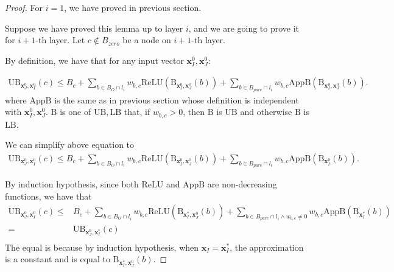 \documentclass[]{article}
\theoremstyle{definition}
\newcommand{\ReLU}{\mathrm{ReLU}}
\newcommand{\UB}{\mathrm{UB}}
\newcommand{\LB}{\mathrm{LB}}
\newcommand{\B}{\mathrm{B}}
\begin{document}
\begin{proof}
	
	For $i= 1$, we have proved in previous section.
	
	Suppose we have proved this lemma up to layer $i$, and we are going to prove it for $i+1$-th layer. Let $c\notin B_{zero}$ be a node on $i+1$-th layer.
	
	By definition, we have that for any input vector $\boldsymbol{x}^0_I,\boldsymbol{x}^0_J$:
	
	\begin{align*}
		\mathrm{UB}_{\boldsymbol{x}^0_J,\boldsymbol{x}^0_I}(c) \leq B_c + \sum_{b\in B_O\cap l_i} w_{b,c}\ReLU(\B_{\boldsymbol{x}^0_I,\boldsymbol{x}^0_J}(b)) + \sum_{b\in B_{pure}\cap l_{i}} w_{b,c} \mathrm{AppB}(\B_{\boldsymbol{x}^0_I,\boldsymbol{x}^0_J}(b)).
	\end{align*} where $\mathrm{AppB}$ is the same as in previous section  whose definition is independent with $\boldsymbol{x}^0_I,\boldsymbol{x}^0_J$. $\B$ is one of $\UB,\LB$  that, if $w_{b,c}>0$, then $\B$ is $\UB$ and otherwise $\B$ is $\LB$.
	
	We can simplify above equation to \begin{align*}
			\mathrm{UB}_{\boldsymbol{x}^0_J,\boldsymbol{x}^0_I}(c) \leq B_c + \sum_{b\in B_O\cap l_i} w_{b,c}\ReLU(\B_{\boldsymbol{x}^0_I,\boldsymbol{x}^0_J}(b)) + \sum_{b\in B_{pure}\cap l_{i}} w_{b,c} \mathrm{AppB}(\B_{\boldsymbol{x}^0_I}(b)).
	\end{align*}
	
	By induction hypothesis, since both $\ReLU$ and $\mathrm{AppB}$ are non-decreasing functions, we have that \begin{align*}
		\mathrm{UB}_{\boldsymbol{x}^0_J,\boldsymbol{x}^0_I}(c)\leq 
		 &B_c + \sum_{b\in B_O\cap l_i} w_{b,c}\ReLU(\B_{\boldsymbol{x}^*_I,\boldsymbol{x}^0_J}(b)) + \sum_{b\in B_{pure}\cap l_{i}\wedge w_{b,c}\neq 0} w_{b,c} \mathrm{AppB}(\B_{\boldsymbol{x}^*_I}(b))\\
		= & \mathrm{UB}_{\boldsymbol{x}^0_J,\boldsymbol{x}^*_I}(c) \\
	\end{align*} The equal is because by induction hypothesis, when $\boldsymbol{x}_I=\boldsymbol{x}_I^*$, the approximation is a constant and is equal to $\B_{\boldsymbol{x}^*_I,\boldsymbol{x}^0_J}(b)$.
	

\end{proof}
\end{document}
